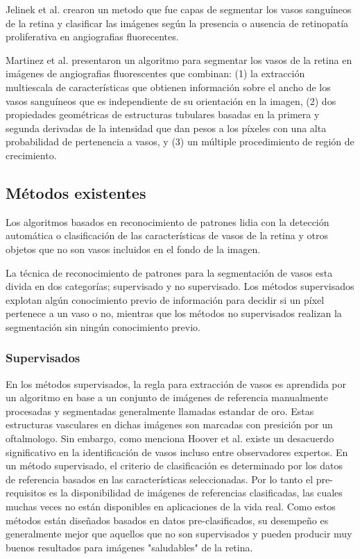 Jelinek et al. \cite{jelinek2007automated} crearon un metodo que fue capas de segmentar los vasos sanguíneos de la retina y clasificar las imágenes según la presencia o ausencia de retinopatía proliferativa en angiografias fluorecentes.

Martinez et al. \cite{martinez2007segmentation} presentaron un algoritmo para segmentar los vasos de la retina  en imágenes de  angiografias fluorescentes que combinan: (1) la extracción multiescala de características que obtienen información sobre el ancho de los vasos sanguíneos que es independiente de su orientación en la imagen, (2) dos propiedades geométricas de estructuras tubulares basadas en la primera y segunda derivadas de la intensidad que dan pesos a los píxeles con una alta probabilidad de pertenencia a vasos, y (3) un múltiple procedimiento de región de crecimiento.



	\subsection{M\'etodos existentes}

Los algoritmos basados en reconocimiento de patrones lidia con la detección automática o clasificación de las características de vasos de la retina y otros objetos que no son vasos incluidos en el fondo de la imagen.

La t\'ecnica de reconocimiento de patrones para la segmentaci\'on de vasos esta divida en dos categor\'ias; supervisado y no supervisado. Los m\'etodos supervisados explotan alg\'un conocimiento previo de informaci\'on para decidir si un p\'ixel pertenece a un vaso o no, mientras que los métodos no supervisados realizan la segmentación sin ningún conocimiento previo.\cite{fraz2012blood}

	\subsubsection{Supervisados}

En los m\'etodos supervisados, la regla para extracci\'on de vasos es aprendida por un algoritmo en base a un conjunto de im\'agenes de referencia manualmente procesadas y segmentadas generalmente llamadas estandar de oro. Estas estructuras vasculares en dichas im\'agenes son marcadas con presici\'on por un oftalmologo. Sin embargo, como menciona Hoover et al. \cite{hoover2000locating} existe un desacuerdo significativo en la identificaci\'on de vasos incluso entre observadores expertos. En un m\'etodo supervisado, el criterio de clasificaci\'on es determinado por los datos de referencia basados en las caracter\'isticas seleccionadas. Por lo tanto el pre-requisitos es la disponibilidad de im\'agenes de referencias clasificadas, las cuales muchas veces no est\'an disponibles en aplicaciones de la vida real. Como estos m\'etodos est\'an dise\~nados basados en datos pre-clasificados, su desempeño es generalmente mejor que aquellos que no son supervisados y pueden producir muy buenos resultados para im\'agenes "saludables" de la retina.

